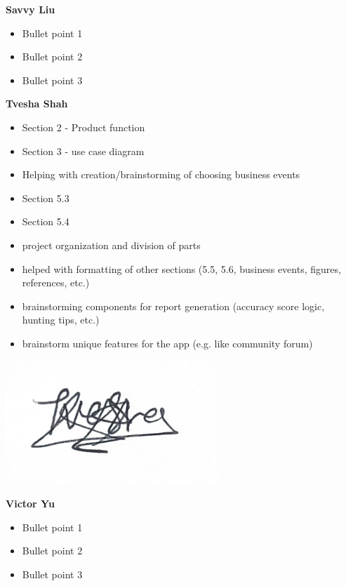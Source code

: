 \documentclass[]{article}
\begin{document}
\textbf{Savvy Liu}
\begin{itemize}
\setlength\itemindent{2em}
\item Bullet point 1
\item Bullet point 2
\item Bullet point 3
\end{itemize} 


\textbf{Tvesha Shah}
\begin{itemize}
    \setlength\itemindent{2em}
    \item Section 2 - Product function
    \item Section 3 - use case diagram 
    \item Helping with creation/brainstorming of choosing business events 
    \item Section 5.3 
    \item Section 5.4 
    \item project organization and division of parts 
    \item helped with formatting of other sections (5.5, 5.6, business events, figures, references, etc.)
    \item brainstorming components for report generation (accuracy score logic, hunting tips, etc.)
    \item brainstorm unique features for the app (e.g. like community forum)
\end{itemize}
\includegraphics[width=0.6\textwidth]{Tvesha.png}

\textbf{Victor Yu}
\begin{itemize}
    \setlength\itemindent{2em}
\item Bullet point 1
\item Bullet point 2
\item Bullet point 3
\end{itemize}
\end{document}
